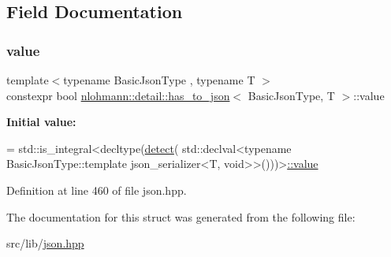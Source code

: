 \subsection{Field Documentation}
\mbox{\label{structnlohmann_1_1detail_1_1has__to__json_a18e260c3c6f10328637c4427d3cb3a31}} 
\subsubsection{\texorpdfstring{value}{value}}
{\footnotesize\ttfamily template$<$typename Basic\+Json\+Type , typename T $>$ \\
constexpr bool \hyperlink{structnlohmann_1_1detail_1_1has__to__json}{nlohmann\+::detail\+::has\+\_\+to\+\_\+json}$<$ Basic\+Json\+Type, T $>$\+::value\hspace{0.3cm}{\ttfamily [static]}}

{\bfseries Initial value\+:}
\begin{DoxyCode}
= std::is\_integral<decltype(\hyperlink{structnlohmann_1_1detail_1_1has__to__json_af087d9dfdab8443f2b95e8b6c8612742}{detect}(
                                      std::declval<\textcolor{keyword}{typename} BasicJsonType::template json\_serializer<T,
       void>>()))>\hyperlink{structnlohmann_1_1detail_1_1has__to__json_a18e260c3c6f10328637c4427d3cb3a31}{::value}
\end{DoxyCode}


Definition at line 460 of file json.\+hpp.



The documentation for this struct was generated from the following file\+:\begin{DoxyCompactItemize}
\item 
src/lib/\hyperlink{json_8hpp}{json.\+hpp}\end{DoxyCompactItemize}

